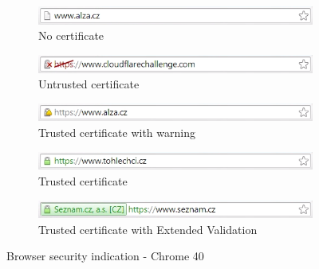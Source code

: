 \begin{figure}
  \begin{subfigure}[b]{\textwidth}
    \centering
    \includegraphics[scale=0.6]{images/browsers/ch-none.png}
    \caption{No certificate}
  \end{subfigure}
  \begin{subfigure}[b]{\textwidth}
    \centering
    \includegraphics[scale=0.6]{images/browsers/ch-untrusted.png}
    \caption{Untrusted certificate}
  \end{subfigure}
  \begin{subfigure}[b]{\textwidth}
    \centering
    \includegraphics[scale=0.6]{images/browsers/ch-warning.png}
    \caption{Trusted certificate with warning}
  \end{subfigure}
  \begin{subfigure}[b]{\textwidth}
    \centering
    \includegraphics[scale=0.6]{images/browsers/ch-dv.png}
    \caption{Trusted certificate}
  \end{subfigure}
  \begin{subfigure}[b]{\textwidth}
    \centering
    \includegraphics[scale=0.6]{images/browsers/ch-ev.png}
    \caption{Trusted certificate with Extended Validation}
  \end{subfigure}
  \caption{Browser security indication - Chrome 40}
\end{figure}


